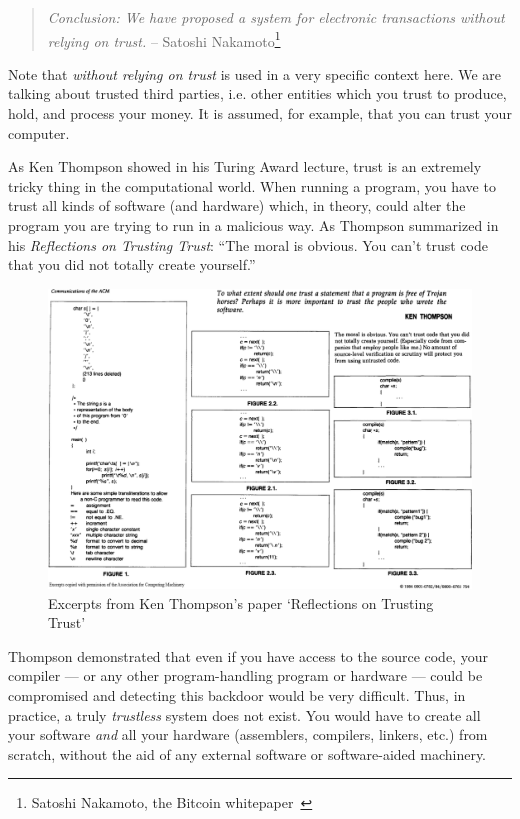 \begin{quotation}
\textit{Conclusion: We have proposed a system for electronic transactions
without relying on trust.}
\flushright -- Satoshi Nakamoto\footnote{Satoshi Nakamoto, the Bitcoin whitepaper~\cite{whitepaper}}
\end{quotation}

Note that \textit{without relying on trust} is used in a very specific context
here. We are talking about trusted third parties, i.e. other entities
which you trust to produce, hold, and process your money. It is assumed,
for example, that you can trust your computer.

As Ken Thompson showed in his Turing Award lecture, trust is an
extremely tricky thing in the computational world. When running a
program, you have to trust all kinds of software (and hardware) which,
in theory, could alter the program you are trying to run in a malicious
way. As Thompson summarized in his \textit{Reflections on Trusting Trust}:
\enquote{The moral is obvious. You can't trust code that you did not totally
create yourself.}~\cite{trusting-trust}

\begin{figure}
  \includegraphics{assets/images/ken-thompson-hack.png}
  \caption{Excerpts from Ken Thompson's paper `Reflections on Trusting Trust'}
  \label{fig:ken-thompson-hack}
\end{figure}

Thompson demonstrated that even if you have access to the source code,
your compiler --- or any other program-handling program or
hardware --- could be compromised and detecting this backdoor would be
very difficult. Thus, in practice, a truly \textit{trustless} system does not
exist. You would have to create all your software \textit{and} all your
hardware (assemblers, compilers, linkers, etc.) from scratch, without
the aid of any external software or software-aided machinery.

